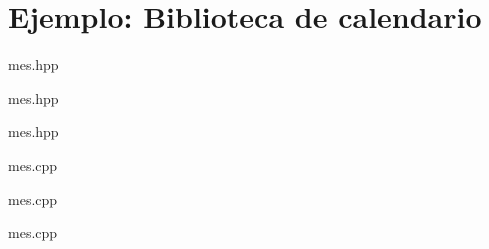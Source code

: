 \section{Ejemplo: Biblioteca de calendario}

 {

\begin{frame}[t]
\begin{block}{mes.hpp}


\end{block}
\end{frame}

\begin{frame}[t]
\begin{block}{mes.hpp}

\end{block}
\end{frame}

}

 {
\begin{frame}[t]
\begin{block}{mes.hpp}

\end{block}
\end{frame}
}

 {

\begin{frame}[t]
\begin{block}{mes.cpp}

\end{block}
\end{frame}

\begin{frame}[t]
\begin{block}{mes.cpp}

\end{block}
\end{frame}

}

 {

\begin{frame}[t]
\begin{block}{mes.cpp}

\end{block}
\end{frame}

}


